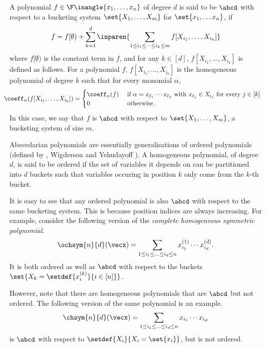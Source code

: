 \begin{definition}\label{def:ordPoly}
	A polynomial $f \in \F\inangle{x_1, \ldots, x_n}$ of degree $d$ is said to be $\abcd$ with respect to a bucketing system $\set{X_1, \ldots, X_m}$ for $\set{x_1, \ldots x_n}$, if  
	\[
		f = f[\emptyset) + \sum_{k=1}^{d} \inparen{\sum_{1 \leq i_1 \leq \cdots \leq i_k \leq m} f[X_{i_1}, \ldots, X_{i_k}]}
	\] 
	where $f[\emptyset)$ is the constant term in $f$, and for any $k \in [d]$, $f[X_{i_1}, \ldots, X_{i_k}]$ is defined as follows. 
	For a polynomial $f$, $f[X_{i_1}, \ldots, X_{i_k}]$ is the homogeneous polynomial of degree $k$ such that for every monomial $\alpha$,
	\[
		\hspace{-1em} \coeff_\alpha(f[X_{i_1}, \ldots, X_{i_k}]) =
		\begin{cases}
			\coeff_\alpha(f) & \text{ if } \alpha = x_{\ell_1} \cdots x_{\ell_k} \text{ with } x_{\ell_j} \in X_{i_j} \text{ for every } j \in [k]\\
			0 & \text{ otherwise.} 
		\end{cases}
	\]
	In this case, we say that $f$ is $\abcd$ with respect to $\set{X_1, \ldots, X_m}$, a bucketing system of size $m$.
\end{definition}

Abecedarian polynomials are essentially generalisations of ordered polynomials (defined by {\Hrubes}, Wigderson and Yehudayoff \cite{HWY11}).
A homogeneous polynomial, of degree $d$, is said to be ordered if the set of variables it depends on can be partitioned into $d$ buckets such that variables occuring in position $k$ only come from the $k$-th bucket.

It is easy to see that any ordered polynomial is also $\abcd$ with respect to the same bucketing system.
This is because position indices are always increasing. 
For example, consider the following version of the \emph{complete homogeneous symmetric polynomial}.
\[
	\ochsym{n}{d} (\vecx) = \sum_{1 \leq i_1 \leq \ldots \leq i_d \leq n} x^{(1)}_{i_1} \cdots x^{(d)}_{i_d}.
\]
It is both ordered as well as $\abcd$ with respect to the buckets $\set{X_k = \setdef{x^{(k)}_i}{i \in [n]}}$.

However, note that there are homogeneous polynomials that are $\abcd$ but not ordered.
The following version of the same polynomial is an example.
\[
	\chsym{n}{d} (\vecx) = \sum_{1 \leq i_1 \leq \ldots \leq i_d \leq n} x_{i_1} \cdots x_{i_d}
\]
is $\abcd$ with respect to $\setdef{X_i}{X_i = \set{x_i}}$, but is not ordered.

